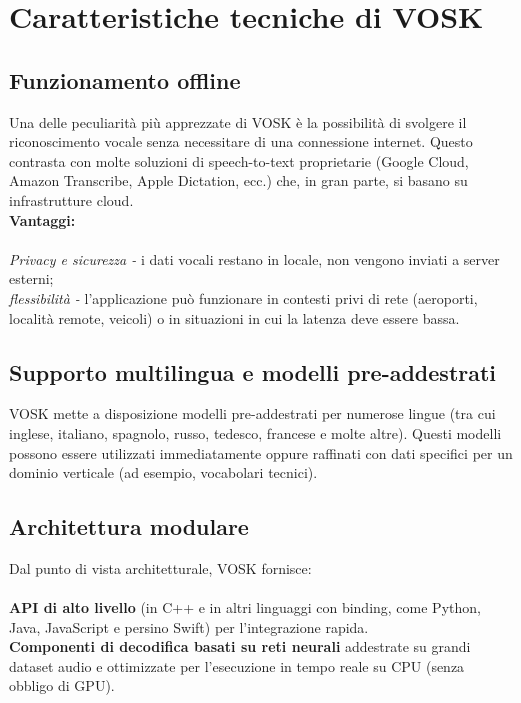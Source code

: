 \documentclass[14pt]{extbook}
\begin{document}
\section{Caratteristiche tecniche di VOSK}
\subsection{Funzionamento offline}
Una delle peculiarità più apprezzate di VOSK è la possibilità di svolgere il riconoscimento vocale senza necessitare di una connessione internet. Questo contrasta con molte soluzioni di speech-to-text proprietarie (Google Cloud, Amazon Transcribe, Apple Dictation, ecc.) che, in gran parte, si basano su infrastrutture cloud.\\

\textbf{Vantaggi:}\\\\
\textit{Privacy e sicurezza -} i dati vocali restano in locale, non vengono inviati a server esterni;\\
\textit{flessibilità -} l’applicazione può funzionare in contesti privi di rete (aeroporti, località remote, veicoli) o in situazioni in cui la latenza deve essere bassa.\\

\subsection{Supporto multilingua e modelli pre-addestrati}
VOSK mette a disposizione modelli pre-addestrati per numerose lingue (tra cui inglese, italiano, spagnolo, russo, tedesco, francese e molte altre). Questi modelli possono essere utilizzati immediatamente oppure raffinati con dati specifici per un dominio verticale (ad esempio, vocabolari tecnici).\\

\subsection{Architettura modulare}
Dal punto di vista architetturale, VOSK fornisce:\\\\
\textbf{API di alto livello} (in C++ e in altri linguaggi con binding, come Python, Java, JavaScript e persino Swift) per l’integrazione rapida.\\
\textbf{Componenti di decodifica basati su reti neurali} addestrate su grandi dataset audio e ottimizzate per l’esecuzione in tempo reale su CPU (senza obbligo di GPU).\\
\end{document}
